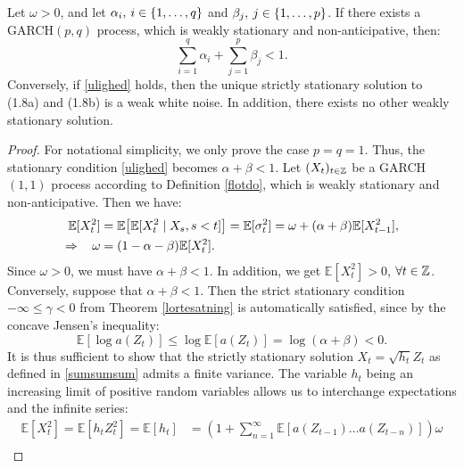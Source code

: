 \begin{thm}
Let $\omega>0$, and let $\alpha_{i},\hspace{2 pt} i\in \{1,\dots, q\}$ and $\beta_{j},\hspace{2 pt} j\in \{1,\dots, p\}$. If there exists a GARCH$(p,q)$ process, which is weakly stationary and non-anticipative, then:
\begin{equation}\label{ulighed}
    \sum_{i=1}^{q}\alpha_{i}+\sum_{j=1}^{p}\beta_{j}<1.
\end{equation}
Conversely, if \eqref{ulighed} holds, then the unique strictly stationary solution to (1.8a) and (1.8b) is a weak white noise. In addition, there exists no other weakly stationary solution.
\end{thm}
\begin{proof}
For notational simplicity, we only prove the case $p=q=1$. Thus, the stationary condition \eqref{ulighed} becomes $\alpha+\beta<1$. Let $(X_{t})_{t\in\mathbb{Z}}$ be a GARCH$(1,1)$ process according to Definition \ref{flotdo}, which is weakly stationary and non-anticipative. Then we have: 
\begin{align}
    \mathbb{E}[X_{t}^{2}]& =\mathbb{E}\left[\mathbb{E}[X_{t}^{2}\mid X_{s}, s<t]\right] =\mathbb{E}[\sigma_{t}^{2}]=\omega+(\alpha+\beta)\mathbb{E}[X_{t-1}^{2}],\\
    \Rightarrow \hspace{9 pt}\omega &=(1-\alpha-\beta)\mathbb{E}[X_{t}^{2}].
\end{align}
Since $\omega> 0$, we must have $\alpha+\beta<1$. In addition, we get $\mathbb{E}[X_{t}^{2}]>0$, $\forall t\in \mathbb{Z}$. Conversely, suppose that $\alpha+\beta <1$. Then the strict stationary condition $-\infty\leq \gamma<0$ from Theorem \ref{lortesatning} is automatically satisfied, since by the concave Jensen's inequality:
\begin{equation}
    \mathbb{E}[\log a(Z_{t})]\leq \log \mathbb{E}[a(Z_{t})]=\log(\alpha+\beta)<0.
\end{equation}
It is thus sufficient to show that the strictly stationary solution $X_{t}=\sqrt{h_{t}}Z_{t}$ as defined in \eqref{sumsumsum} admits a finite variance. The variable $h_{t}$ being an increasing limit of positive random variables allows us to interchange expectations and the infinite series:
\begin{align*}
    \mathbb{E}[X_{t}^{2}]=\mathbb{E}[h_{t}Z_{t}^{2}]=\mathbb{E}[h_{t}]&=\left(1+\sum_{n=1}^{\infty}\mathbb{E}\left[a(Z_{t-1})\dots a(Z_{t-n})\right]\right)\omega\\

\end{align*}
\end{proof}
